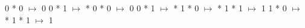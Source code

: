 0 * 0 $\mapsto$ 0    
0 * 1 $\mapsto$ *    
0 * 0 $\mapsto$ 0    
0 * 1 $\mapsto$ *    
1 * 0 $\mapsto$ *    
1 * 1 $\mapsto$ 1    
1 * 0 $\mapsto$ *    
1 * 1 $\mapsto$ 1    
